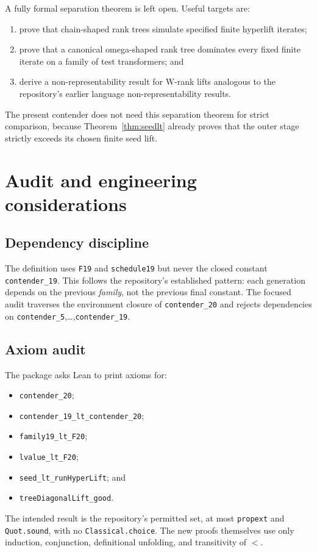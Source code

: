 \documentclass[11pt]{article}
\theoremstyle{definition}
\theoremstyle{remark}
\newcommand{\code}[1]{\texttt{#1}}
\begin{document}
A fully formal separation theorem is left open.  Useful targets are:
\begin{enumerate}[leftmargin=*]
\item prove that chain-shaped rank trees simulate specified finite hyperlift
  iterates;
\item prove that a canonical omega-shaped rank tree dominates every fixed
  finite iterate on a family of test transformers; and
\item derive a non-representability result for W-rank lifts analogous to the
  repository's earlier language non-representability results.
\end{enumerate}

The present contender does not need this separation theorem for strict
comparison, because Theorem~\ref{thm:seedlt} already proves that the outer stage
strictly exceeds its chosen finite seed lift.

\section{Audit and engineering considerations}

\subsection{Dependency discipline}

The definition uses \code{F19} and \code{schedule19} but never the closed
constant \code{contender\_19}.  This follows the repository's established
pattern: each generation depends on the previous \emph{family}, not the
previous final constant.  The focused audit traverses the environment closure
of \code{contender\_20} and rejects dependencies on
\code{contender\_5},\ldots,\code{contender\_19}.

\subsection{Axiom audit}

The package asks Lean to print axioms for:
\begin{itemize}[leftmargin=*]
\item \code{contender\_20};
\item \code{contender\_19\_lt\_contender\_20};
\item \code{family19\_lt\_F20};
\item \code{lvalue\_lt\_F20};
\item \code{seed\_lt\_runHyperLift}; and
\item \code{treeDiagonalLift\_good}.
\end{itemize}
The intended result is the repository's permitted set, at most
\code{propext} and \code{Quot.sound}, with no \code{Classical.choice}.  The new
proofs themselves use only induction, conjunction, definitional unfolding,
and transitivity of \(<\).
\end{document}
